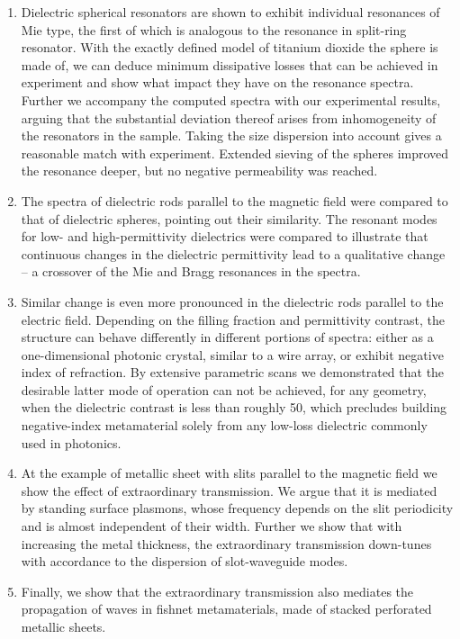 \begin{enumerate}
{} 
\item{Dielectric spherical resonators are shown to exhibit individual resonances of Mie type, the first of which is analogous to the resonance in split-ring resonator. With the exactly defined model of titanium dioxide the sphere is made of, we can deduce minimum dissipative losses that can be achieved in experiment and show what impact they have on the resonance spectra. Further we accompany the computed spectra with our experimental results, arguing that the substantial deviation thereof arises from inhomogeneity of the resonators in the sample. Taking the size dispersion into account gives a reasonable match with experiment. Extended sieving of the spheres improved the resonance deeper, but no negative permeability was reached.
} 
\item{The spectra of dielectric rods parallel to the magnetic field were compared to that of dielectric spheres, pointing out their similarity. The resonant modes for low- and high-permittivity dielectrics were compared to illustrate that continuous changes in the dielectric permittivity lead to a qualitative change -- a crossover of the Mie and Bragg resonances in the spectra.
} 
\item{Similar change is even more pronounced in the dielectric rods parallel to the electric field. Depending on the filling fraction and permittivity contrast, the structure can behave differently in different portions of spectra: either as a one-dimensional photonic crystal, similar to a wire array, or exhibit negative index of refraction. By extensive parametric scans we demonstrated that the desirable latter mode of operation  can not be achieved, for any geometry, when the dielectric contrast is less than roughly 50, which precludes building negative-index metamaterial solely from any low-loss dielectric commonly used in photonics. 
} 
\item{At the example of metallic sheet with slits parallel to the magnetic field we show the effect of extraordinary transmission. We argue that it is mediated by standing surface plasmons, whose frequency depends on the slit periodicity and is almost independent of their width. Further we show that with increasing the metal thickness, the extraordinary transmission down-tunes with accordance to the dispersion of slot-waveguide modes.
} 
\item{Finally, we show that the extraordinary transmission also mediates the propagation of waves in fishnet metamaterials, made of stacked perforated metallic sheets. 
}
\end{enumerate}

